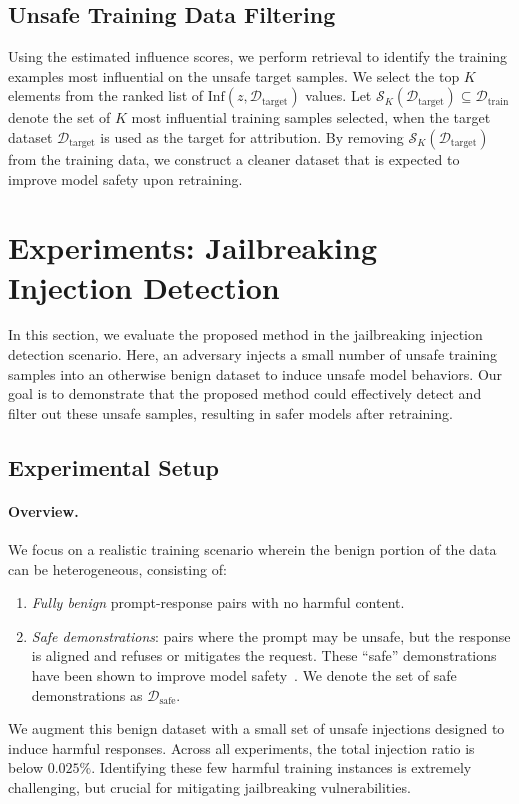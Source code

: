 \documentclass[11pt]{article}
\begin{document}
\subsection{Unsafe Training Data Filtering}
Using the estimated influence scores, we perform retrieval to identify the training examples most influential on the unsafe target samples.
We select the top $K$ elements from the ranked list of $\text{Inf}(z, \mathcal{D}_{\text{target}})$ values. Let $\mathcal{S}_{K}(\mathcal{D}_{\text{target}}) \subseteq \mathcal{D}_{\text{train}}$ denote the set of $K$ most influential training samples selected, when the target dataset $\mathcal{D}_{\text{target}}$ is used as the target for attribution. By removing $\mathcal{S}_{K}(\mathcal{D}_{\text{target}})$ from the training data, we construct a cleaner dataset that is expected to improve model safety upon retraining.

\section{Experiments: Jailbreaking Injection Detection} 
In this section, we evaluate the proposed method in the jailbreaking injection detection scenario. Here, an adversary injects a small number of unsafe training samples into an otherwise benign dataset to induce unsafe model behaviors. Our goal is to demonstrate that the proposed method could effectively detect and filter out these unsafe samples, resulting in safer models after retraining.

\subsection{Experimental Setup}

\paragraph{Overview.} We focus on a realistic training scenario wherein the benign portion of the data can be heterogeneous, consisting of: \begin{enumerate} 
\item \emph{Fully benign} prompt-response pairs with no harmful content. 
\item \emph{Safe demonstrations}: pairs where the prompt may be unsafe, but the response is aligned and refuses or mitigates the request. These ``safe'' demonstrations have been shown to improve model safety~\citep{jain2023baselinedefensesadversarialattacks}. We denote the set of safe demonstrations as $\mathcal{D}_{\text{safe}}$.
\end{enumerate} 
We augment this benign dataset with a small set of unsafe injections designed to induce harmful responses. Across all experiments, the total injection ratio is below $0.025\%$. Identifying these few harmful training instances is extremely challenging, but crucial for mitigating jailbreaking vulnerabilities.
\end{document}
